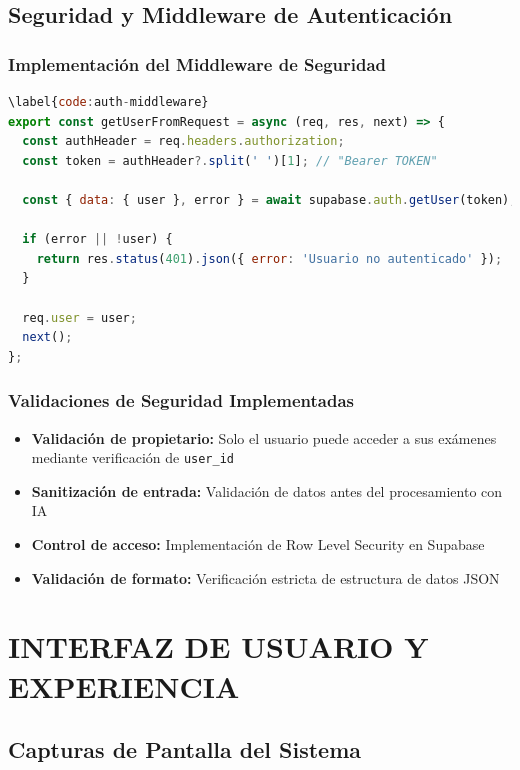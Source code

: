 \documentclass[12pt,a4paper]{report}
\begin{document}
\section{Seguridad y Middleware de Autenticación}

\subsection{Implementación del Middleware de Seguridad}

\begin{lstlisting}[language=JavaScript, caption={Código \ref{code:auth-middleware}: Middleware de seguridad y autenticación}]
\label{code:auth-middleware}
export const getUserFromRequest = async (req, res, next) => {
  const authHeader = req.headers.authorization;
  const token = authHeader?.split(' ')[1]; // "Bearer TOKEN"
  
  const { data: { user }, error } = await supabase.auth.getUser(token);
  
  if (error || !user) {
    return res.status(401).json({ error: 'Usuario no autenticado' });
  }
  
  req.user = user;
  next();
};
\end{lstlisting}

\subsection{Validaciones de Seguridad Implementadas}

\begin{itemize}
\item \textbf{Validación de propietario:} Solo el usuario puede acceder a sus exámenes mediante verificación de \texttt{user\_id}
\item \textbf{Sanitización de entrada:} Validación de datos antes del procesamiento con IA
\item \textbf{Control de acceso:} Implementación de Row Level Security en Supabase
\item \textbf{Validación de formato:} Verificación estricta de estructura de datos JSON
\end{itemize}

\chapter{INTERFAZ DE USUARIO Y EXPERIENCIA}

\section{Capturas de Pantalla del Sistema}
\end{document}
